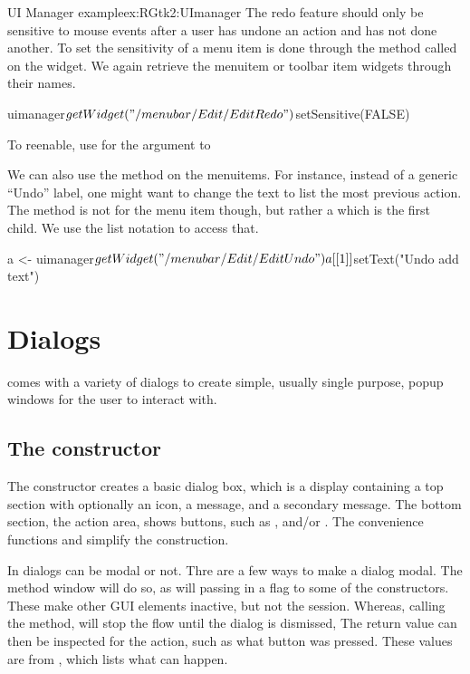 \begin{example}{UI Manager example}{ex:RGtk2:UImanager}
The redo feature should only be sensitive to mouse events after a user
has undone an action and has not done another. To set the sensitivity
of a menu item is done through the  method called
on the widget. We again retrieve the menuitem or toolbar item widgets
through their names.

\begin{Schunk}
\begin{Sinput}
 uimanager$getWidget("/menubar/Edit/EditRedo")$setSensitive(FALSE)
\end{Sinput}
\end{Schunk}
To reenable, use  for the argument to 

We can also use the  method on the menuitems. For
instance, instead of a generic ``Undo'' label, one might want to
change the text to list the most previous action.  The method is not
for the menu item though, but rather a  which is the
first child. We use the list notation to access that.
\begin{Schunk}
\begin{Sinput}
 a <- uimanager$getWidget("/menubar/Edit/EditUndo")
 a[[1]]$setText("Undo add text")
\end{Sinput}
\end{Schunk}
\end{example}


\label{sec:RGtk2:dialogs}
\section{Dialogs}
\label{sec:dialogs}
\GTK\/ comes with a variety of dialogs to create simple, usually
single purpose, popup windows
for the user to interact with.

\subsection{The  constructor}

The constructor  creates a basic dialog box,
which is a display containing a top section with optionally an icon, a
message, and a secondary message. The bottom section, the action area,
shows buttons, such as ,  and/or
. The convenience functions
 and
 simplify the construction.

In \GTK\/ dialogs can be modal or not. Thre are a few ways to make a
dialog modal. The method window  will do
so, as will passing in a  flag to some of the
constructors. These make other GUI elements inactive, but not the \R\/
session. Whereas, calling the  method,
will stop the flow until the dialog is dismissed, The return value can
then be inspected for the action, such as what button was
pressed. These values are from , which lists
what can happen.


